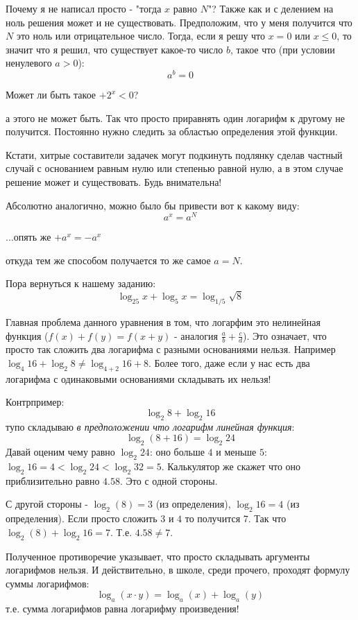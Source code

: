 \documentclass{article}
\begin{document}
Почему я не написал просто - "тогда $x$ равно $N$"? Также как и с делением на ноль решения может и не существовать. Предположим, что у меня получится что $N$ это ноль или отрицательное число. Тогда, если я решу что $x=0$ или $x\le{}0$, то значит что я решил, что существует какое-то число $b$, такое что (при условии ненулевого $a>0$):
$$a^b=0$$

Может ли быть такое $+2^x<0$?

а этого не может быть. Так что просто приравнять один логарифм к другому не получится. Постоянно нужно следить за областью определения этой функции.

Кстати, хитрые составители задачек могут подкинуть подлянку сделав частный случай с основанием равным нулю или степенью равной нулю, а в этом случае решение может и существовать. Будь внимательна!

Абсолютно аналогично, можно было бы привести вот к какому виду:
$$a^x=a^N$$

...опять же $+a^x=-a^x$

откуда тем же способом получается то же самое $a=N$.

Пора вернуться к нашему заданию:
$$\log_{25}{x}+\log_{5}{x}=\log_{1/5}{\sqrt{8}}$$

Главная проблема данного уравнения в том, что логарфим это нелинейная функция ($f(x)+f(y)=f(x+y)$ - аналогия $\frac{a}{b}+\frac{c}{d}$). Это означает, что просто так сложить два логарифма с разными основаниями нельзя. Например $\log_{4}{16}+\log_{2}{8} \ne \log_{4+2}{16+8}$. Более того, даже если у нас есть два логарифма с одинаковыми основаниями складывать их нельзя! 

Контрпример:
$$\log_{2}{8} + \log_{2}{16}$$
тупо складываю \textit{в предположении что логарифм линейная функция}:
$$\log_{2}{(8+16)} = \log_{2}{24}$$
Давай оценим чему равно $\log_{2}{24}$: оно больше $4$ и меньше $5$: $\log_{2}{16}=4 < \log_{2}{24} < \log_{2}{32}=5$. Калькулятор же скажет что оно приблизительно равно $4.58$. Это с одной стороны.

С другой стороны - $\log_{2}(8)=3$ (из определения), $\log_{2}{16}=4$ (из определения). Если просто сложить $3$ и $4$ то получится $7$. Так что $\log_{2}(8)+\log_{2}{16} = 7$. Т.е. $4.58 \ne 7$.

Полученное противоречие указывает, что просто складывать аргументы логарифмов нельзя. И действительно, в школе, среди прочего, проходят формулу суммы логарифмов:
$$\log_{a}{(x\cdot{}y)} = \log_{a}{(x)} + \log_{a}{(y)}$$
т.е. сумма логарифмов равна логарифму произведения!
\end{document}
